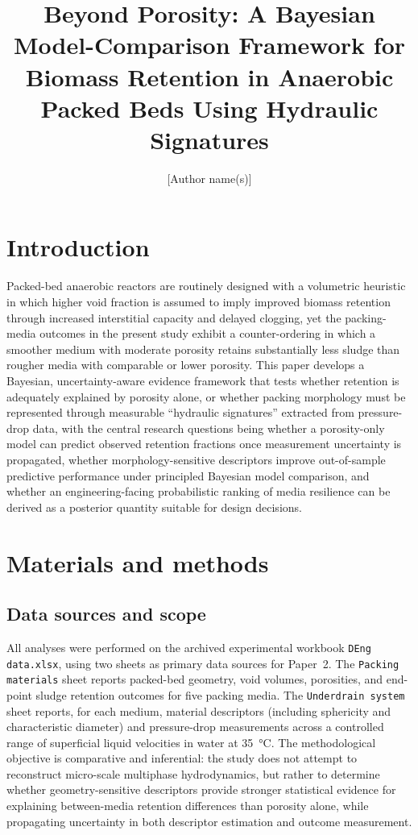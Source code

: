 \documentclass[11pt]{article}
\title{Beyond Porosity: A Bayesian Model-Comparison Framework for Biomass Retention in Anaerobic Packed Beds Using Hydraulic Signatures}
\author{[Author name(s)]}
\date{}
\begin{document}
\maketitle

\section{Introduction}
Packed-bed anaerobic reactors are routinely designed with a volumetric heuristic in which higher void fraction is assumed to imply improved biomass retention through increased interstitial capacity and delayed clogging, yet the packing-media outcomes in the present study exhibit a counter-ordering in which a smoother medium with moderate porosity retains substantially less sludge than rougher media with comparable or lower porosity. This paper develops a Bayesian, uncertainty-aware evidence framework that tests whether retention is adequately explained by porosity alone, or whether packing morphology must be represented through measurable ``hydraulic signatures'' extracted from pressure-drop data, with the central research questions being whether a porosity-only model can predict observed retention fractions once measurement uncertainty is propagated, whether morphology-sensitive descriptors improve out-of-sample predictive performance under principled Bayesian model comparison, and whether an engineering-facing probabilistic ranking of media resilience can be derived as a posterior quantity suitable for design decisions.

\section{Materials and methods}

\subsection{Data sources and scope}
All analyses were performed on the archived experimental workbook \texttt{DEng data.xlsx}, using two sheets as primary data sources for Paper~2. The \texttt{Packing materials} sheet reports packed-bed geometry, void volumes, porosities, and end-point sludge retention outcomes for five packing media. The \texttt{Underdrain system} sheet reports, for each medium, material descriptors (including sphericity and characteristic diameter) and pressure-drop measurements across a controlled range of superficial liquid velocities in water at \SI{35}{\celsius}. The methodological objective is comparative and inferential: the study does not attempt to reconstruct micro-scale multiphase hydrodynamics, but rather to determine whether geometry-sensitive descriptors provide stronger statistical evidence for explaining between-media retention differences than porosity alone, while propagating uncertainty in both descriptor estimation and outcome measurement.
\end{document}

